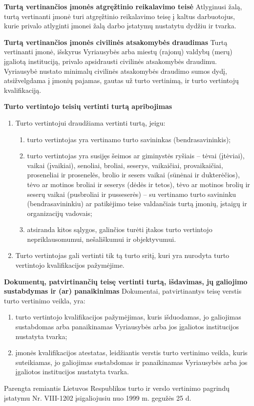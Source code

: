 \textbf{Turtą vertinančios įmonės atgręžtinio reikalavimo teisė}
Atlyginusi žalą, turtą vertinanti įmonė turi atgręžtinio reikalavimo teisę į kaltus darbuotojus, kurie privalo atlyginti įmonei žalą darbo įstatymų nustatytu dydžiu ir tvarka.

 

\textbf{Turtą vertinančios įmonės civilinės atsakomybės draudimas}
Turtą vertinanti įmonė, išskyrus Vyriausybės arba miestų (rajonų) valdybų (merų) įgaliotą instituciją, privalo apsidrausti civilinės atsakomybės draudimu. Vyriausybė nustato minimalų civilinės atsakomybės draudimo sumos dydį, atsižvelgdama į įmonių pajamas, gautas už turto vertinimą, ir turto vertintojų kvalifikaciją.



\textbf{Turto vertintojo teisių vertinti turtą apribojimas}
\begin{enumerate}
    \item Turto vertintojui draudžiama vertinti turtą, jeigu:
    \begin{enumerate}
        \item turto vertintojas yra vertinamo turto savininkas (bendrasavininkis);
        \item turto vertintojas yra susijęs šeimos ar giminystės ryšiais – tėvai (įtėviai), vaikai (įvaikiai), senoliai, broliai, seserys, vaikaičiai, provaikaičiai, proseneliai ir prosenelės, brolio ir sesers vaikai (sūnėnai ir dukterėčios), tėvo ar motinos broliai ir seserys (dėdės ir tetos), tėvo ar motinos brolių ir seserų vaikai (pusbroliai ir pusseserės) – su vertinamo turto savininku (bendrasavininkiu) ar patikėjimo teise valdančiais turtą įmonių, įstaigų ir organizacijų vadovais;
        \item atsiranda kitos sąlygos, galinčios turėti įtakos turto vertintojo nepriklausomumui, nešališkumui ir objektyvumui.
    \end{enumerate}
    \item Turto vertintojas gali vertinti tik tą turto sritį, kuri yra nurodyta turto vertintojo kvalifikacijos pažymėjime.
\end{enumerate}



\textbf{Dokumentų, patvirtinančių teisę vertinti turtą, išdavimas, jų galiojimo sustabdymas ir (ar) panaikinimas}
Dokumentai, patvirtinantys teisę verstis turto vertinimo veikla, yra:
\begin{enumerate}
    \item turto vertintojo kvalifikacijos pažymėjimas, kuris išduodamas, jo galiojimas sustabdomas arba panaikinamas Vyriausybės arba jos įgaliotos institucijos nustatyta tvarka;
    \item įmonės kvalifikacijos atestatas, leidžiantis verstis turto vertinimo veikla, kuris suteikiamas, jo galiojimas sustabdomas ir panaikinamas Vyriausybės arba jos įgaliotos institucijos nustatyta tvarka.
\end{enumerate}

Parengta remiantis Lietuvos Respublikos turto ir verslo vertinimo pagrindų įstatymu Nr. VIII-1202 įsigaliojusiu nuo 1999 m. gegužės 25 d.

\pagebreak